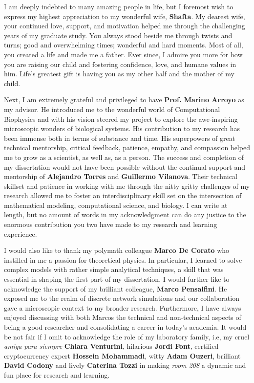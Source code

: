 \begin{Acknowledgements}
	I am deeply indebted to many amazing people in life, but I foremost wish to express my highest appreciation to my wonderful wife, \textbf{Shafta}. My dearest wife, your continued love, support, and motivation helped me through the challenging years of my graduate study. You always stood beside me through twists and turns; 	good and overwhelming times; wonderful and hard moments. Most of all, you created a life and made me a father. Ever since, I admire you more for how you are raising our child and fostering confidence, love, and humane values in him. Life's greatest gift is having you as my other half and the mother of my child. 
	
	Next, I am extremely grateful and privileged to have \textbf{Prof. Marino Arroyo} as my advisor.  He introduced me to the wonderful world of Computational Biophysics and with his vision steered my project to explore the awe-inspiring microscopic wonders of biological systems. His contribution to my research has been immense both in terms of 
	substance and time. His superpowers of great technical mentorship, critical feedback, patience, empathy, and compassion helped me to grow as a scientist, as well as, as a person.  The success and completion of my dissertation would not have been possible without the continual support and mentorship of \textbf{Alejandro Torres} and \textbf{Guillermo Vilanova}. Their technical skillset and patience in working with me through the nitty gritty challenges of my research allowed me to foster an interdisciplinary skill set on the intersection of mathematical modeling, computational science, and biology. I can write at length, but no amount of words in my acknowledgment can do any justice to the enormous contribution you two have made to my research and learning experience.
	
	
	I would also like to thank my polymath colleague \textbf{Marco De Corato} who instilled in me a passion for theoretical physics. In particular, I learned to solve complex models with rather simple analytical techniques, a skill that was essential in shaping the first part of my dissertation.  I would further like to acknowledge the support of my brilliant colleague, \textbf{Marco Pensalfini}. He exposed me to the realm of discrete network simulations and our collaboration gave a microscopic context to my broader research.
	Furthermore, I have always enjoyed discussing with both Marcos the technical and non-technical aspects of being a good researcher and consolidating a career in today’s academia. 
	It would be not fair if I omit to acknowledge the role of my laboratory family, i.e,  my cruel \textit{amiga para siempre} \textbf{Chiara Venturini}, hilarious \textbf{Jordi Font},  certified cryptocurrency expert \textbf{Hossein Mohammadi}, witty \textbf{Adam Ouzeri}, brilliant \textbf{David Codony} and lively \textbf{Caterina Tozzi} in making \textit{room 208} a dynamic and fun place for research and learning.  
	

\end{Acknowledgements}
